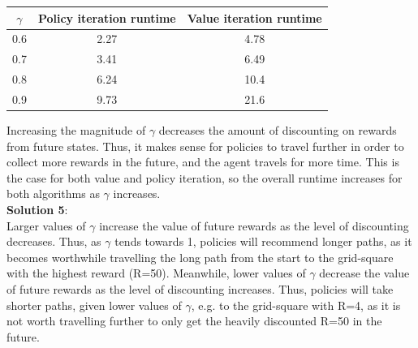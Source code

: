 \documentclass[submit]{harvardml}
\begin{document}
\begin{center}
        \begin{tabular}{ |c|c|c| } 
        \hline
        \texttt{$\gamma$} & Policy iteration runtime & Value iteration runtime \\
        \hline
        0.6 & 2.27 & 4.78\\
        \hline
        0.7 & 3.41 & 6.49\\
        \hline
        0.8 & 6.24 & 10.4\\
        \hline
        0.9 & 9.73 & 21.6\\
        \hline
        \end{tabular}
\end{center}
Increasing the magnitude of $\gamma$ decreases the amount of discounting on rewards from future states. Thus, it makes sense for policies to travel further in order to collect more rewards in the future, and the agent travels for more time. This is the case for both value and policy iteration, so the overall runtime increases for both algorithms as $\gamma$ increases.\\

\textbf{Solution 5}:\\
Larger values of $\gamma$ increase the value of future rewards as the level of discounting decreases. Thus, as $\gamma$ tends towards 1, policies will recommend longer paths, as it becomes worthwhile travelling the long path from the start to the grid-square with the highest reward (R=50). Meanwhile, lower values of $\gamma$ decrease the value of future rewards as the level of discounting increases. Thus, policies will take shorter paths, given lower values of $\gamma$, e.g. to the grid-square with R=4, as it is not worth travelling further to only get the heavily discounted R=50 in the future.
\end{document}
